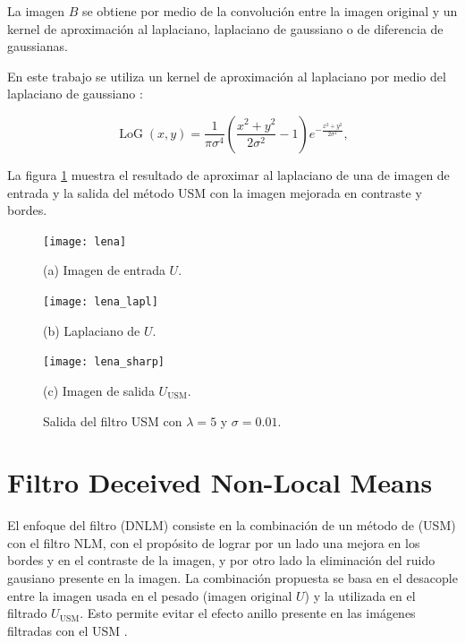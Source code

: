 La imagen $B$ se obtiene por medio de la convolución entre la imagen original y un kernel de aproximación al laplaciano, laplaciano de gaussiano o de diferencia de gaussianas.


En este trabajo se utiliza un kernel de aproximación al laplaciano por medio del laplaciano de gaussiano \cite{sotak1989laplacian}:

\begin{equation}
\label{eq:log}
\operatorname{LoG}(x,y) = \frac{1}{\pi\sigma^4}\left(\frac{x^2+y^2}{2\sigma^2} - 1\right)e^{-\frac{x^2+y^2}{2\sigma^2}},
\end{equation}

La figura \ref{fig:exampleUSM} muestra el resultado de aproximar al laplaciano de una de imagen de entrada y la salida del método USM con la imagen mejorada en contraste y bordes. 

\begin{figure}[H]
%
\begin{minipage}{0.25\textwidth}
  \centering
  \centerline{\texttt{[image: lena]}}
  \centerline{(a) Imagen de entrada $U$.}\medskip
\end{minipage}
\hfill
\begin{minipage}{0.25\textwidth}
  \centering
  \centerline{\texttt{[image: lena\_lapl]}}
  \centerline{(b) Laplaciano de $U$.}
\end{minipage}
\hfill
\begin{minipage}{0.25\textwidth}
  \centering
  \centerline{\texttt{[image: lena\_sharp]}}
  \centerline{(c) Imagen de salida $U_{\textrm{USM}}$.}\medskip
\end{minipage}
%
\caption[Ejemplo de mejora en imagen con ]{Salida del filtro USM con $\lambda = 5$ y $\sigma = 0.01$. \label{fig:exampleUSM}}
%
\end{figure}


\section{Filtro Deceived Non-Local Means}
\label{ch:marco_dnlm}


El enfoque del filtro  (DNLM) consiste en la combinación de un método de  (USM) con el filtro NLM, con el propósito de lograr por un lado una mejora en los bordes y en el contraste de la imagen, y por otro lado la eliminación del ruido gausiano  presente en la imagen. La combinación propuesta se basa en el desacople entre la imagen usada en el pesado (imagen original $U$) y la utilizada en el filtrado $U_{\textrm{USM}}$. Esto permite evitar el efecto anillo presente en las im\'agenes filtradas con el USM \cite{calderon2015dewaff}.

